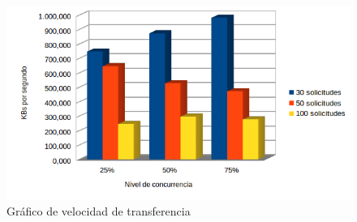 \begin{figure}[!ht]
	\begin{center}
		\includegraphics[width=1\textwidth]{../images/gra_vt.png}
		\caption{Gráfico de velocidad de transferencia}
		\label{fig:gra_te}
	\end{center}
\end{figure}